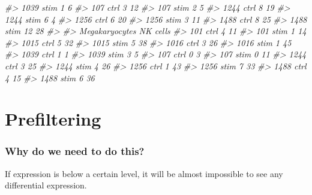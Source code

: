 \documentclass[
]{book}
\newenvironment{Shaded}{\begin{snugshade}}{\end{snugshade}}
\newcommand{\CommentTok}[1]{\textcolor[rgb]{0.56,0.35,0.01}{\textit{#1}}}
\begin{document}
\begin{Shaded}
\begin{Highlighting}[]
\CommentTok{\#\textgreater{}   1039 stim               1                 6}
\CommentTok{\#\textgreater{}   107 ctrl                3                12}
\CommentTok{\#\textgreater{}   107 stim                2                 5}
\CommentTok{\#\textgreater{}   1244 ctrl               8                19}
\CommentTok{\#\textgreater{}   1244 stim               6                 4}
\CommentTok{\#\textgreater{}   1256 ctrl               6                20}
\CommentTok{\#\textgreater{}   1256 stim               3                11}
\CommentTok{\#\textgreater{}   1488 ctrl               8                25}
\CommentTok{\#\textgreater{}   1488 stim              12                28}
\CommentTok{\#\textgreater{}            }
\CommentTok{\#\textgreater{}             Megakaryocytes NK cells}
\CommentTok{\#\textgreater{}   101 ctrl               4       11}
\CommentTok{\#\textgreater{}   101 stim               1       14}
\CommentTok{\#\textgreater{}   1015 ctrl              5       32}
\CommentTok{\#\textgreater{}   1015 stim              5       38}
\CommentTok{\#\textgreater{}   1016 ctrl              3       26}
\CommentTok{\#\textgreater{}   1016 stim              1       45}
\CommentTok{\#\textgreater{}   1039 ctrl              1        1}
\CommentTok{\#\textgreater{}   1039 stim              3        5}
\CommentTok{\#\textgreater{}   107 ctrl               0        3}
\CommentTok{\#\textgreater{}   107 stim               0       11}
\CommentTok{\#\textgreater{}   1244 ctrl              3       25}
\CommentTok{\#\textgreater{}   1244 stim              4       26}
\CommentTok{\#\textgreater{}   1256 ctrl              1       43}
\CommentTok{\#\textgreater{}   1256 stim              7       33}
\CommentTok{\#\textgreater{}   1488 ctrl              4       15}
\CommentTok{\#\textgreater{}   1488 stim              6       36}
\end{Highlighting}
\end{Shaded}

\section{Prefiltering}\label{prefiltering}

\subsubsection*{Why do we need to do this?}\label{why-do-we-need-to-do-this-8}

If expression is below a certain level, it will be almost impossible to see any differential expression.
\end{document}
